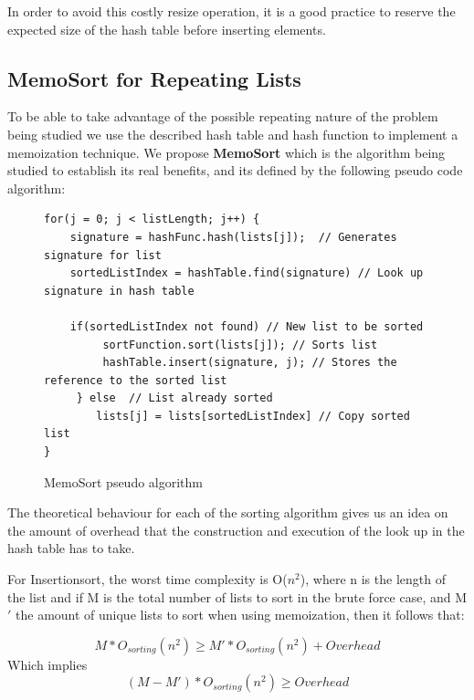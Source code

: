 \documentclass[a4paper,12pt]{article}
\begin{document}
In order to avoid this costly resize operation, it is a good practice to reserve the expected size of the hash table before inserting elements. 

\subsection{MemoSort for Repeating Lists}
To be able to take advantage of the possible repeating nature of the problem being studied we use the described hash table and hash function to implement a memoization technique. We propose \textbf{MemoSort} which is the algorithm being studied to establish its real benefits, and its defined by the following pseudo code algorithm: 

\begin{figure}[H]
\begin{small}
\begin{verbatim}
for(j = 0; j < listLength; j++) {
    signature = hashFunc.hash(lists[j]);  // Generates signature for list
    sortedListIndex = hashTable.find(signature) // Look up signature in hash table
    
    if(sortedListIndex not found) // New list to be sorted
         sortFunction.sort(lists[j]); // Sorts list
         hashTable.insert(signature, j); // Stores the reference to the sorted list
     } else  // List already sorted
        lists[j] = lists[sortedListIndex] // Copy sorted list
}
\end{verbatim}
\end{small}
\caption{MemoSort pseudo algorithm}
\end{figure}

The theoretical behaviour for each of the sorting algorithm gives us an idea on the amount of overhead that the construction and  execution of the look up in the hash table has to take. 

For Insertionsort, the worst time complexity is O($n^2$), where n is the length of the list and if M is the total number of lists to sort in the brute force case, and M$'$ the amount of unique lists to sort when using memoization, then it follows that:

\begin{equation}
M * O_{sorting}(n^2)  \geq M' * O_{sorting}(n^2)  + Overhead
\end{equation}
Which implies
\begin{equation}
(M - M') *  O_{sorting}(n^2)  \geq Overhead
\end{equation}
\end{document}
